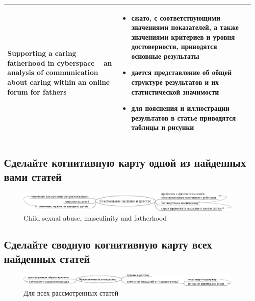 \documentclass{../../common/thesisbyxetex}
\begin{document}
\begin{longtable}[t]{|P{0.25\textwidth}|P{0.65\textwidth}|}
\\ \hline

Supporting a caring fatherhood in cyberspace – an analysis of communication about caring within an online forum for
fathers &
\begin{itemize}
\item сжато, с соответствующими значениями показателей, а также значениями критериев и уровня достоверности, приводятся
основные результаты
\item дается представление об общей структуре результатов и их статистической значимости
\item для пояснения и иллюстрации результатов в статье приводятся таблицы и рисунки
\end{itemize}

\\ \hline

\end{longtable}

\begin{landscape}
\subsection*{Сделайте когнитивную карту одной из найденных вами статей}

\begin{figure}[ht!]
 \begin{center}
  \includegraphics[scale=0.85]{child_sexual_abuse.eps}
  \caption{Child sexual abuse, masculinity and fatherhood}\label{childsexabuse}
 \end{center}

\end{figure}


\subsection*{Сделайте сводную когнитивную карту всех найденных статей}
\begin{figure}[ht!]
 \begin{center}
  \includegraphics[scale=0.85]{all_articles.eps}
  \caption{Для всех рассмотренных статей}\label{alarticles}
 \end{center}

\end{figure}
\end{landscape}

\end{document}
